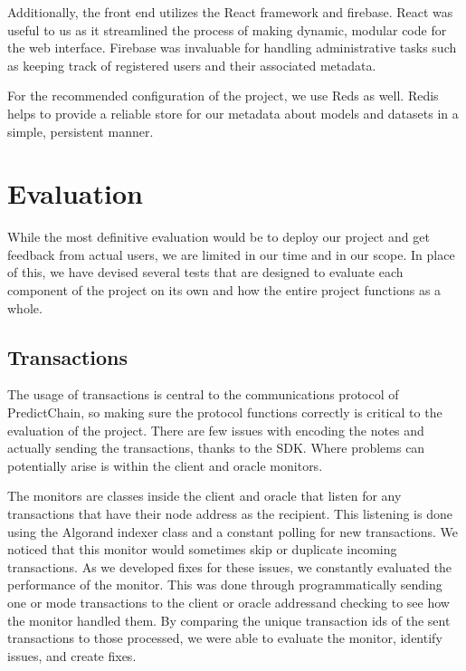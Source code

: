 \documentclass{article}
\begin{document}
    Additionally, the front end utilizes the React framework and firebase.  React was useful to us as it streamlined the process of making
    dynamic, modular code for the web interface.  Firebase was invaluable for handling administrative tasks such as keeping
    track of registered users and their associated metadata.

    For the recommended configuration of the project, we use Reds as well.  Redis helps to provide a reliable store for
    our metadata about models and datasets in a simple, persistent manner.

    \section{Evaluation}


    While the most definitive evaluation would be to deploy our project and get feedback from actual users, we are limited
    in our time and in our scope.  In place of this, we have devised several tests that are designed to evaluate each
    component of the project on its own and how the entire project functions as a whole.

    \subsection{Transactions}

    The usage of transactions is central to the communications protocol of PredictChain, so making sure the protocol
    functions correctly is critical to the evaluation of the project.  There are few issues with encoding the
    notes and actually sending the transactions, thanks to the SDK.  Where problems can potentially arise is within the
    client and oracle monitors.

    The monitors are classes inside the client and oracle that listen for any transactions that have their node address
    as the recipient.  This listening is done using the Algorand indexer class and a constant polling for new transactions.
    We noticed that this monitor would sometimes skip or duplicate incoming transactions.  As we developed fixes for
    these issues, we constantly evaluated the performance of the monitor.  This was done through programmatically sending
    one or mode transactions to the client or oracle addressand checking to see how the monitor handled them.  By comparing
    the unique transaction ids of the sent transactions to those processed, we were able to evaluate the monitor,
    identify issues, and create fixes.
\end{document}
